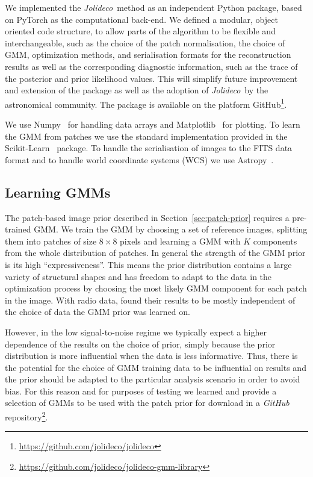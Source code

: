 \documentclass[twocolumn]{aastex631}
\newcommand{\jolideco}{\textit{Jolideco}~}
\begin{document}
    We implemented the \jolideco method as an independent Python package, based on PyTorch as the computational back-end.  We defined a modular, object oriented code structure, to allow parts of the algorithm to be flexible and interchangeable, such as the choice of the patch normalisation, the choice of GMM, optimization methods, and serialisation formats for the reconstruction results as well as the corresponding diagnostic information, such as the trace of the posterior and prior likelihood values. This will simplify future improvement and extension of the package as well as the adoption of \jolideco by the astronomical community. The package is available on the platform GitHub\footnote{\url{https://github.com/jolideco/jolideco}}.

    We use Numpy~\citep{Numpy2020} for handling data arrays and Matplotlib~\citep{Hunter2007} for plotting. To learn the GMM from patches we use the standard implementation provided in the Scikit-Learn~\citep{scikit-learn} package. To handle the serialisation of images to the FITS data format and to handle world coordinate systems (WCS) we use Astropy~\citep{Astropy2018}.

    \subsection{Learning GMMs}
    \label{ssec:jolideco-gmm-library}
    The patch-based image prior described in Section~\ref{sec:patch-prior} requires a pre-trained GMM. We train the GMM by choosing a set of reference images, splitting them into patches of size $8\times8$ pixels and learning a GMM with $K$ components from the whole distribution of patches. In general the strength of the GMM prior is its high \enquote{expressiveness}. This means the prior distribution contains a large variety of structural shapes and has freedom to adapt to the data in the optimization process by choosing the most likely GMM component for each patch in the image. With radio data, \cite{Bouman2016} found their results to be mostly independent of the choice of data the GMM prior was learned on. 
    
    However, in the low signal-to-noise regime we typically expect a higher dependence of the results on the choice of prior, simply because the prior distribution is more influential when the data is less informative. Thus, there is the potential for the choice of GMM training data to be influential on results and the prior should be adapted to the particular analysis scenario in order to avoid bias. For this reason and for purposes of testing we learned and provide a selection of GMMs to be used with the patch prior for download in a \textit{GitHub} repository\footnote{\url{https://github.com/jolideco/jolideco-gmm-library}}. 
    
\end{document}
